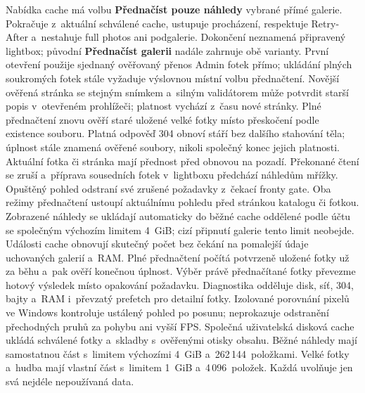 \documentclass[11pt,a4paper]{article}
\begin{document}
Nabídka cache má volbu \textbf{Přednačíst pouze náhledy} vybrané přímé galerie.
Pokračuje z~aktuální schválené cache, ustupuje procházení, respektuje Retry-After
a~nestahuje full photos ani podgalerie. Dokončení neznamená připravený lightbox;
původní \textbf{Přednačíst galerii} nadále zahrnuje obě varianty.
První otevření použije sjednaný ověřovaný přenos Admin fotek přímo;
ukládání plných soukromých fotek stále vyžaduje výslovnou místní volbu přednačtení.
Novější ověřená stránka se stejným snímkem a~silným validátorem může potvrdit
starší popis v~otevřeném prohlížeči; platnost vychází z~času nové stránky.
Plné přednačtení znovu ověří staré uložené velké fotky místo přeskočení podle
existence souboru. Platná odpověď 304 obnoví stáří bez dalšího stahování těla;
úplnost stále znamená ověřené soubory, nikoli společný konec jejich platnosti.
Aktuální fotka či stránka mají přednost před obnovou na pozadí. Překonané čtení
se zruší a~příprava sousedních fotek v~lightboxu předchází náhledům mřížky.
Opuštěný pohled odstraní své zrušené požadavky z~čekací fronty gate.
Oba režimy přednačtení ustoupí aktuálnímu pohledu před stránkou katalogu či fotkou.
Zobrazené náhledy se ukládají automaticky do běžné cache oddělené podle účtu
se společným výchozím limitem 4~GiB; cizí připnutí galerie tento limit neobejde.
Události cache obnovují skutečný počet bez čekání na pomalejší údaje uchovaných
galerií a~RAM. Plné přednačtení počítá potvrzeně uložené fotky už za běhu a~pak
ověří konečnou úplnost. Výběr právě přednačítané fotky převezme hotový výsledek
místo opakování požadavku. Diagnostika odděluje disk, síť, 304, bajty a~RAM
i~převzatý prefetch pro detailní fotky.
Izolované porovnání pixelů ve Windows kontroluje ustálený pohled po posunu;
neprokazuje odstranění přechodných pruhů za pohybu ani vyšší FPS.
Společná uživatelská disková cache ukládá schválené fotky a~skladby
s~ověřenými otisky obsahu. Běžné náhledy mají samostatnou část s~limitem
výchozími 4~GiB a~262\,144~položkami. Velké fotky a~hudba mají vlastní část s~limitem
1~GiB a~4\,096~položek. Každá uvolňuje jen svá nejdéle nepoužívaná data.
\end{document}
